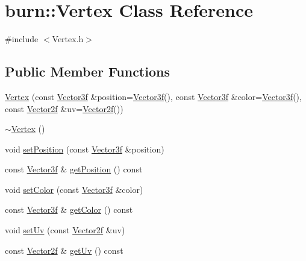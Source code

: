 \hypertarget{classburn_1_1_vertex}{\section{burn\-:\-:Vertex Class Reference}
\label{classburn_1_1_vertex}
}


{\ttfamily \#include $<$Vertex.\-h$>$}

\subsection*{Public Member Functions}
\begin{DoxyCompactItemize}
\item 
\hyperlink{classburn_1_1_vertex_ae8eacfebc5e61f6660f875fb6eefdb03}{Vertex} (const \hyperlink{namespaceburn_a9d6d349c94bc4dc9699427216128a0ef}{Vector3f} \&position=\hyperlink{namespaceburn_a9d6d349c94bc4dc9699427216128a0ef}{Vector3f}(), const \hyperlink{namespaceburn_a9d6d349c94bc4dc9699427216128a0ef}{Vector3f} \&color=\hyperlink{namespaceburn_a9d6d349c94bc4dc9699427216128a0ef}{Vector3f}(), const \hyperlink{namespaceburn_a2af71ec5609a2f2d501827804e86a9b8}{Vector2f} \&uv=\hyperlink{namespaceburn_a2af71ec5609a2f2d501827804e86a9b8}{Vector2f}())
\item 
\hyperlink{classburn_1_1_vertex_ad950d9459711c1ba4223de35623f75b6}{$\sim$\-Vertex} ()
\item 
void \hyperlink{classburn_1_1_vertex_aa38bae183bbe857f9fabeb8e5510e9a0}{set\-Position} (const \hyperlink{namespaceburn_a9d6d349c94bc4dc9699427216128a0ef}{Vector3f} \&position)
\item 
const \hyperlink{namespaceburn_a9d6d349c94bc4dc9699427216128a0ef}{Vector3f} \& \hyperlink{classburn_1_1_vertex_afdc13277da83f244302ddfc1b6863444}{get\-Position} () const 
\item 
void \hyperlink{classburn_1_1_vertex_a57e2bf8a6e58c7d02c8431f03239cc6b}{set\-Color} (const \hyperlink{namespaceburn_a9d6d349c94bc4dc9699427216128a0ef}{Vector3f} \&color)
\item 
const \hyperlink{namespaceburn_a9d6d349c94bc4dc9699427216128a0ef}{Vector3f} \& \hyperlink{classburn_1_1_vertex_a1dcb11a63a04b0e279e8a69df85dd8d6}{get\-Color} () const 
\item 
void \hyperlink{classburn_1_1_vertex_afc4eff1b4065852cb856b690006e0bd8}{set\-Uv} (const \hyperlink{namespaceburn_a2af71ec5609a2f2d501827804e86a9b8}{Vector2f} \&uv)
\item 
const \hyperlink{namespaceburn_a2af71ec5609a2f2d501827804e86a9b8}{Vector2f} \& \hyperlink{classburn_1_1_vertex_a277e9b082825c211acf730b46580301a}{get\-Uv} () const 
\end{DoxyCompactItemize}


